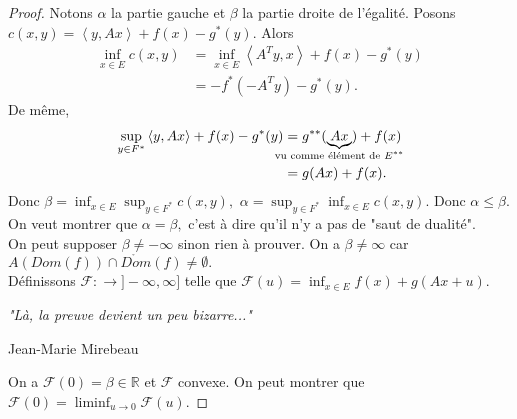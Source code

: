 \begin{proof}
    Notons $\alpha $ la partie gauche et $\beta$ la partie droite de l'égalité. Posons $c(x,y)=\left<y,Ax \right>+f(x)-g^*(y).$ Alors
    \begin{align*}
        \inf_{x\in E}c(x,y) &= \inf_{x\in E}\left<A^Ty,x \right>+f(x)-g^*(y)\\
                            &=-f^*(-A^Ty)-g^*(y).
    \end{align*}
    De même,
    \begin{align*}
        \sup_{y\in F^*}\left<y,Ax \right>+f(x)-g^*(y) &= g^{**}(\underbrace{Ax}_{\mathclap{\text{vu comme élément de }E^{**}}})+f(x)\\
                                                      &=g(Ax)+f(x).
    \end{align*}
    Donc $\beta=\inf_{x\in E}\sup_{y\in F^*}c(x,y),$ $\alpha =\sup_{y\in F^*}\inf_{x\in E}c(x,y)$. Donc $\alpha \le \beta.$ On veut montrer que $\alpha =\beta,$ c'est à dire qu'il n'y a pas de "saut de dualité".\\
    On peut supposer $\beta\neq -\infty $ sinon rien à prouver. On a $\beta\neq \infty $ car $A(Dom(f))\cap \mathring{Dom}(f)\neq \emptyset .$\\
    Définissons $\mathcal{F}:\to ]-\infty ,\infty ]$ telle que $\mathcal{F}(u)=\inf_{x\in E}f(x)+g(Ax+u)$.
    
    \epigraph{\itshape "Là, la preuve devient un peu bizarre..."}{Jean-Marie Mirebeau}
    
    On a $\mathcal{F}(0)=\beta\in \mathbb{R} $ et $\mathcal{F}$ convexe. On peut montrer que $\mathcal{F}(0)=\liminf_{u\to 0}\mathcal{F}(u).$
\end{proof}

